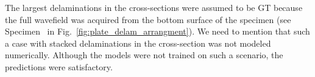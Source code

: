 \begin{sloppypar}
	The largest delaminations in the cross-sections were assumed to be GT because the full wavefield was acquired from the bottom surface of the specimen (see Specimen~ in Fig.~\ref{fig:plate_delam_arrangment}).
	We need to mention that such a case with stacked delaminations in the cross-section was not modeled numerically.
	Although the models were not trained on such a scenario, the predictions were satisfactory.

\end{sloppypar}
